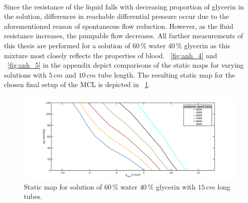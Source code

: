  \\Since the resistance of the liquid falls with decreasing proportion of glycerin in the solution, differences in reachable differential pressure occur due to the aforementioned reason of spontaneous flow reduction. However, as the fluid resistance increases, the pumpable flow decreases. All further measurements of this thesis are performed for a solution of $60\, \%$ water $40\,\%$ glycerin as this mixture most closely reflects the properties of blood.
\figurename~\ref{fig:anh_4} and \figurename~\ref{fig:anh_5} in the appendix depict comparisons of the static maps for varying  solutions with $5\, cm$ and $10\, cm$ tube length.
The resulting static map for the chosen final setup of the MCL is depicted in \figurename~\ref{fig:60w40glong}.

\begin{figure}[ht]
  \centering
  \includegraphics[width=\textwidth]{images/chapt_4/60w40g_long.pdf}
  \caption[Static map for solution of $60\, \%$ water $40\, \%$ glycerin with $15\,cm$ long tubes]{Static map for solution of $60\, \%$ water $40\, \%$ glycerin with $15\,cm$ long tubes.}
  \label{fig:60w40glong}
\end{figure}

